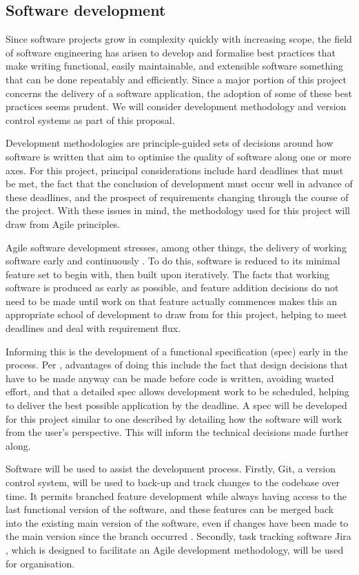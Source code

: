 \documentclass[12pt, a4paper]{amsart}
\begin{document}
\subsection{Software development}
Since software projects grow in complexity quickly with increasing scope, the field of software engineering has arisen to develop and formalise best practices that make writing functional, easily maintainable, and extensible software something that can be done repeatably and efficiently. Since a major portion of this project concerns the delivery of a software application, the adoption of some of these best practices seems prudent. We will consider development methodology and version control systems as part of this proposal. 

Development methodologies are principle-guided sets of decisions around how software is written that aim to optimise the quality of software along one or more axes. For this project, principal considerations include hard deadlines that must be met, the fact that the conclusion of development must occur well in advance of these deadlines, and the prospect of requirements changing through the course of the project. With these issues in mind, the methodology used for this project will draw from Agile principles. 

Agile software development stresses, among other things, the delivery of working software early and continuously \citep{agile}. To do this, software is reduced to its minimal feature set to begin with, then built upon iteratively. The facts that working software is produced as early as possible, and feature addition decisions do not need to be made until work on that feature actually commences makes this an appropriate school of development to draw from for this project, helping to meet deadlines and deal with requirement flux.

Informing this is the development of a functional specification (spec) early in the process. Per \citep{joelspecswhy}, advantages of doing this include the fact that design decisions that have to be made anyway can be made before code is written, avoiding wasted effort, and that a detailed spec allows development work to be scheduled, helping to deliver the best possible application by the deadline. A spec will be developed for this project similar to one described by \citep{joelspecshow} detailing how the software will work from the user's perspective. This will inform the technical decisions made further along. 

Software will be used to assist the development process. Firstly, Git, a version control system, will be used to back-up and track changes to the codebase over time. It permits branched feature development while always having access to the last functional version of the software, and these features can be merged back into the existing main version of the software, even if changes have been made to the main version since the branch occurred \citep{bilschakvcs}. Secondly, task tracking software Jira \citep{jira}, which is designed to facilitate an Agile development methodology, will be used for organisation. 
\end{document}
